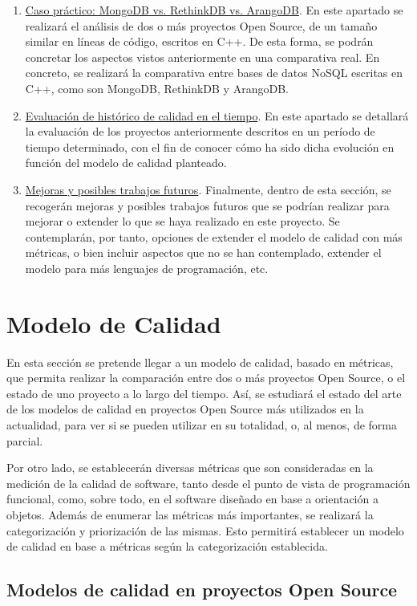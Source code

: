 \documentclass[11pt]{article}
\begin{document}
\begin{enumerate}
\item{\underline{Caso práctico: MongoDB vs. RethinkDB vs. ArangoDB}}. En este apartado se realizará el análisis de dos o más proyectos Open Source, de un tamaño similar en líneas de código, escritos en C++. De esta forma, se podrán concretar los aspectos vistos anteriormente en una comparativa real.
En concreto, se realizará la comparativa entre bases de datos NoSQL escritas en C++, como son MongoDB, RethinkDB y ArangoDB.
\item{\underline{Evaluación de histórico de calidad en el tiempo}}. En este apartado se detallará la evaluación de los proyectos anteriormente descritos en un período de tiempo determinado, con el fin de conocer cómo ha sido dicha evolución en función del modelo de calidad planteado.
\item{\underline{Mejoras y posibles trabajos futuros}}. Finalmente, dentro de esta sección, se recogerán mejoras y posibles trabajos futuros que se podrían realizar para mejorar o extender lo que se haya realizado en este proyecto. Se contemplarán, por tanto, opciones de extender el modelo de calidad con más métricas, o bien incluir aspectos que no se han contemplado, extender el modelo para más lenguajes de programación, etc.
\end{enumerate}

\section{Modelo de Calidad}
En esta sección se pretende llegar a un modelo de calidad, basado en métricas, que permita realizar la comparación entre dos o más proyectos Open Source, o el estado de uno proyecto a lo largo del tiempo. Así, se estudiará el estado del arte de los modelos de calidad en proyectos Open Source más utilizados en la actualidad, para ver si se pueden utilizar en su totalidad, o, al menos, de forma parcial.

Por otro lado, se establecerán diversas métricas que son consideradas en la medición de la calidad de software, tanto desde el punto de vista de programación funcional, como, sobre todo, en el software diseñado en base a orientación a objetos. Además de enumerar las métricas más importantes, se realizará la categorización y priorización de las mismas. Esto permitirá establecer un modelo de calidad en base a métricas según la categorización establecida.

\subsection{Modelos de calidad en proyectos Open Source}
\end{document}

